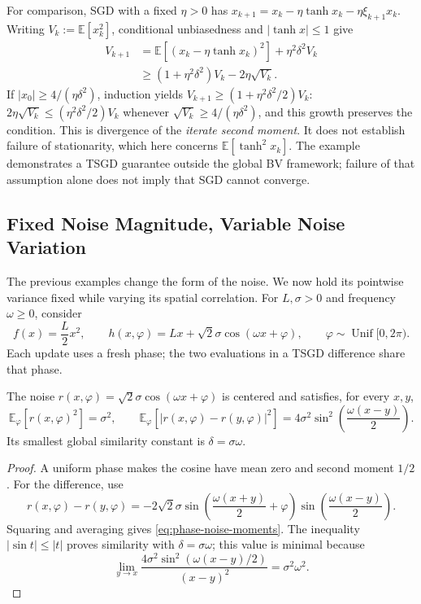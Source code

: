 For comparison, SGD with a fixed $\eta>0$ has
$x_{k+1}=x_k-\eta\tanh x_k-\eta\xi_{k+1}x_k$.
Writing $V_k:=\mathbb E[x_k^2]$, conditional unbiasedness and
$|\tanh x|\leq1$ give
\[
\begin{aligned}
V_{k+1}
&=\mathbb E[(x_k-\eta\tanh x_k)^2]+\eta^2\delta^2V_k\\
&\geq(1+\eta^2\delta^2)V_k-2\eta\sqrt{V_k}.
\end{aligned}
\]
If $|x_0|\geq4/(\eta\delta^2)$, induction yields
$V_{k+1}\geq(1+\eta^2\delta^2/2)V_k$:
$2\eta\sqrt{V_k}\leq(\eta^2\delta^2/2)V_k$ whenever
$\sqrt{V_k}\geq4/(\eta\delta^2)$, and this growth preserves the
condition. This is divergence of the \emph{iterate second moment}.
It does not establish failure of stationarity, which here concerns
$\mathbb E[\tanh^2 x_k]$. The example demonstrates a TSGD guarantee
outside the global BV framework; failure of that assumption alone
does not imply that SGD cannot converge.

\subsection{Fixed Noise Magnitude, Variable Noise Variation}
\label{subsec:fixed-variance-variable-similarity}

The previous examples change the form of the noise. We now hold
its pointwise variance fixed while varying its spatial correlation.
For $L,\sigma>0$ and frequency $\omega\geq0$, consider
\begin{equation}
\label{eq:fixed-variance-oracle}
f(x)=\frac L2x^2,\qquad
h(x,\varphi)=Lx+\sqrt2\sigma\cos(\omega x+\varphi),
\qquad \varphi\sim\operatorname{Unif}[0,2\pi).
\end{equation}
Each update uses a fresh phase; the two evaluations in a TSGD
difference share that phase.

\begin{lemma}
\label{lem:fixed-variance-variable-similarity}
The noise $r(x,\varphi)=\sqrt2\sigma\cos(\omega x+\varphi)$ is
centered and satisfies, for every $x,y$,
\begin{equation}
\label{eq:phase-noise-moments}
\mathbb E_{\varphi}[r(x,\varphi)^2]=\sigma^2,\qquad
\mathbb E_{\varphi}[|r(x,\varphi)-r(y,\varphi)|^2]
=4\sigma^2\sin^2\!\left(\frac{\omega(x-y)}2\right).
\end{equation}
Its smallest global similarity constant is $\delta=\sigma\omega$.
\end{lemma}

\begin{proof}
A uniform phase makes the cosine have mean zero and second moment
$1/2$. For the difference, use
\[
r(x,\varphi)-r(y,\varphi)
=-2\sqrt2\sigma\sin\!\left(\frac{\omega(x+y)}2+\varphi\right)
                 \sin\!\left(\frac{\omega(x-y)}2\right).
\]
Squaring and averaging gives \eqref{eq:phase-noise-moments}.
The inequality $|\sin t|\leq|t|$ proves similarity with
$\delta=\sigma\omega$; this value is minimal because
\[
\lim_{y\to x}
\frac{4\sigma^2\sin^2(\omega(x-y)/2)}{(x-y)^2}
=\sigma^2\omega^2.
\]
\end{proof}

